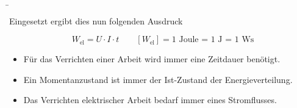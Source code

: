 \begin{frame}
\b{
	Eingesetzt ergibt dies nun folgenden Ausdruck

	\begin{equation*}
		W_\mathrm{{el}} = U \cdot I \cdot t \quad \quad [W_\mathrm{el}] = \text{1 Joule = 1 J = 1 Ws} 
	\end{equation*}
}
		\begin{Merksatz}

			\begin{itemize}
				\item Für das Verrichten einer Arbeit wird immer eine Zeitdauer benötigt.
				\item Ein Momentanzustand ist immer der Ist-Zustand der Energieverteilung.
				\item Das Verrichten elektrischer Arbeit bedarf immer eines Stromflusses.
			\end{itemize}

		\end{Merksatz}

\end{frame}

			

